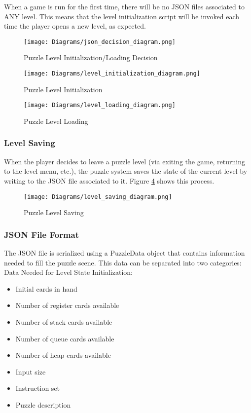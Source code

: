 When a game is run for the first time, there will be no JSON files associated to
ANY level. This means that the level initialization script will be invoked each time
the player opens a new level, as expected.\\

\begin{figure}[!hb]
  \caption{Puzzle Level Initialization/Loading Decision}
  \label{fig:json_decision_diagram}
  \centering
  \texttt{[image: Diagrams/json\_decision\_diagram.png]}
\end{figure}
\vfill
\clearpage

\begin{figure}[!hb]
  \caption{Puzzle Level Initialization}
  \label{fig:level_initialization_diagram}
  \centering
  \texttt{[image: Diagrams/level\_initialization\_diagram.png]}
\end{figure}

\begin{figure}[!hb]
  \caption{Puzzle Level Loading}
  \label{fig:level_loading_diagram}
  \centering
  \texttt{[image: Diagrams/level\_loading\_diagram.png]}
\end{figure}
\vfill
\clearpage

\subsubsection{Level Saving}
When the player decides to leave a puzzle level (via exiting the game, returning to the
level menu, etc.), the puzzle system saves the state of the current level by writing
to the JSON file associated to it. Figure \ref{fig:level_saving_diagram} shows this process.

\begin{figure}[!hb]
  \caption{Puzzle Level Saving}
  \label{fig:level_saving_diagram}
  \centering
  \texttt{[image: Diagrams/level\_saving\_diagram.png]}
\end{figure}

\subsubsection{JSON File Format}
The JSON file is serialized using a PuzzleData object that contains information
needed to fill the puzzle scene. This data can be separated into two categories:\\

Data Needed for Level State Initialization:
\begin{itemize}
  \item Initial cards in hand
  \item Number of register cards available
  \item Number of stack cards available
  \item Number of queue cards available
  \item Number of heap cards available
  \item Input size
  \item Instruction set
  \item Puzzle description
\end{itemize}

